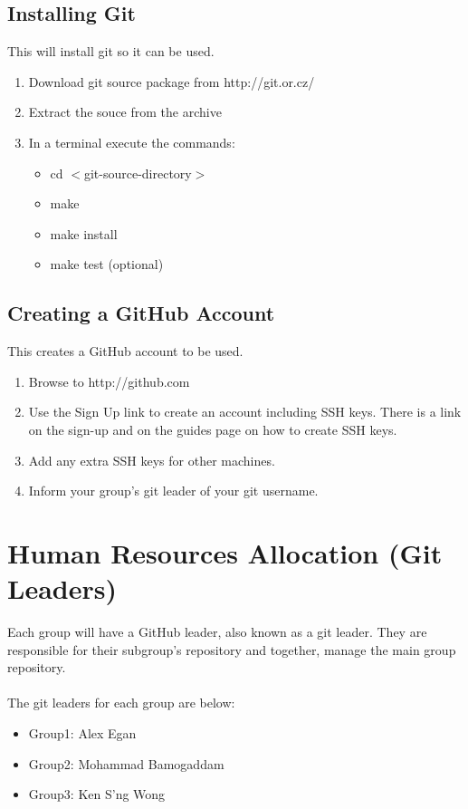 \documentclass{article}
\begin{document}
\subsection{Installing Git}
\label{install}
This will install git so it can be used.
\begin{enumerate}
	\item Download git source package from http://git.or.cz/
	\item Extract the souce from the archive
	\item In a terminal execute the commands:
	\begin{itemize}
		\item cd \(<\)git-source-directory\(>\)
		\item make
		\item make install
		\item make test (optional)
	\end{itemize}
\end{enumerate}

\subsection{Creating a GitHub Account}
\label{account}
This creates a GitHub account to be used.
\begin{enumerate}
	\item Browse to http://github.com
	\item Use the Sign Up link to create an account including SSH keys. There is a link on the sign-up and on the guides page on how to create SSH keys.
	\item Add any extra SSH keys for other machines.
	\item Inform your group's git leader of your git username.
\end{enumerate}


\section{Human Resources Allocation (Git Leaders)}
Each group will have a GitHub leader, also known as a git leader. They are responsible for their subgroup's repository and together, manage the main group repository.\\
\\
The git leaders for each group are below:
\begin{itemize}
	\item Group1: Alex Egan
	\item Group2: Mohammad Bamogaddam
	\item Group3: Ken S'ng Wong
\end{itemize}
\end{document}
